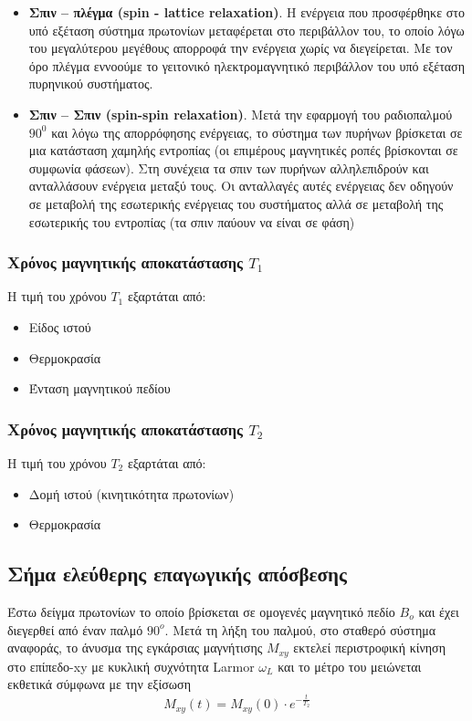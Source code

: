 \documentclass{article}
\begin{document}
\begin{itemize}
    \item \textbf{Σπιν	–	πλέγμα	 (spin - lattice relaxation)}.	Η	ενέργεια	που	προσφέρθηκε	
στο	 υπό	 εξέταση	 σύστημα	 πρωτονίων	 μεταφέρεται	 στο	 περιβάλλον	
του,	 το	 οποίο	 λόγω	 του	 μεγαλύτερου	 μεγέθους	 απορροφά	 την	
ενέργεια	 χωρίς	 να	 διεγείρεται.	 Με	 τον	 όρο	 πλέγμα	 εννοούμε	 το	
γειτονικό	 ηλεκτρομαγνητικό	 περιβάλλον	 του	 υπό	 εξέταση	 πυρηνικού	
συστήματος.		
\item\textbf{ Σπιν	–	Σπιν	(spin-spin relaxation)}. Μετά	την	εφαρμογή	του	ραδιοπαλμού
$90^0$	 και	 λόγω	 της	 απορρόφησης	 ενέργειας,	 το	 σύστημα	 των	 πυρήνων	
βρίσκεται	 σε	 μια	 κατάσταση	 χαμηλής	 εντροπίας	 (οι	 επιμέρους	
μαγνητικές	 ροπές	 βρίσκονται	 σε	 συμφωνία	φάσεων).	Στη	 συνέχεια	 τα	
σπιν	των	πυρήνων	αλληλεπιδρούν	 	και	ανταλλάσουν	ενέργεια	μεταξύ	
τους.	 Οι	 ανταλλαγές	 αυτές	 ενέργειας	 δεν	 οδηγούν	 σε	 μεταβολή	 της	
εσωτερικής	 ενέργειας	 του	 συστήματος	 αλλά	 σε	 μεταβολή	 της	
εσωτερικής	του	εντροπίας	(τα	σπιν	παύουν	να	είναι	σε	φάση)	
\end{itemize}
\subsubsection{Χρόνος	μαγνητικής	αποκατάστασης	$Τ_1$}
Η	τιμή	του	χρόνου	$Τ_1$	εξαρτάται	από:	
\begin{itemize}
    \item Είδος	ιστού	
    \item Θερμοκρασία
    \item Ένταση	μαγνητικού	πεδίου
\end{itemize}
\subsubsection{Χρόνος	μαγνητικής	αποκατάστασης	$Τ_2$}
Η	τιμή	του	χρόνου	$Τ_2$	εξαρτάται	από:	
\begin{itemize}
    \item Δομή	ιστού	(κινητικότητα	πρωτονίων)	
    \item Θερμοκρασία	
    
\end{itemize}
\clearpage

\subsection{Σήμα	ελεύθερης	επαγωγικής	απόσβεσης}
Έστω	δείγμα	πρωτονίων	 το	οποίο	βρίσκεται	σε	ομογενές	μαγνητικό	πεδίο	$Β_o$	και	έχει	διεγερθεί	από	έναν	παλμό	$90^{o}$.
Μετά	 τη	 λήξη	 του	 παλμού,	 στο	 σταθερό	 σύστημα	 αναφοράς,	 το	 άνυσμα	
της	εγκάρσιας	μαγνήτισης	$M_{xy}$	εκτελεί	περιστροφική	κίνηση	στο	επίπεδο-xy
με	 κυκλική	 συχνότητα	 Larmor	 $ω_L$	 και	 το	 μέτρο	 του	 μειώνεται	 εκθετικά	
σύμφωνα	με	την	εξίσωση	
\begin{equation*}
    M_{xy}(t) =   M_{xy}(0) \cdot e^{-\frac{t}{T_2}}
\end{equation*}
   
\end{document}
